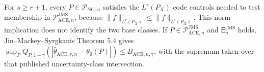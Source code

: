 For \(s\ge r+1\), every \(P\in\mathcal P_{\mathrm{NG},n}\) satisfies the \(L^r(P_X)\) code controls needed to test membership in \(\mathcal P_{\mathrm{ACE},n}^{\mathrm{JMS}}\), because \(\|f\|_{L^r(P_X)}\le\|f\|_{L^s(P_X)}\). This norm implication does not identify the two base classes. If \(P\in\mathcal P_{\mathrm{ACE},n}^{\mathrm{JMS}}\) and \(\mathsf E_n^{\mathrm{JMS}}\) holds, Jin--Mackey--Syrgkanis Theorem 5.4 gives \(\sup_P Q_{P,1-\gamma}(|\widehat\theta_{\mathrm{ACE},r,n}-\theta_0(P)|)\le B_{\mathrm{ACE},n,\gamma}\), with the supremum taken over that published uncertainty-class intersection.